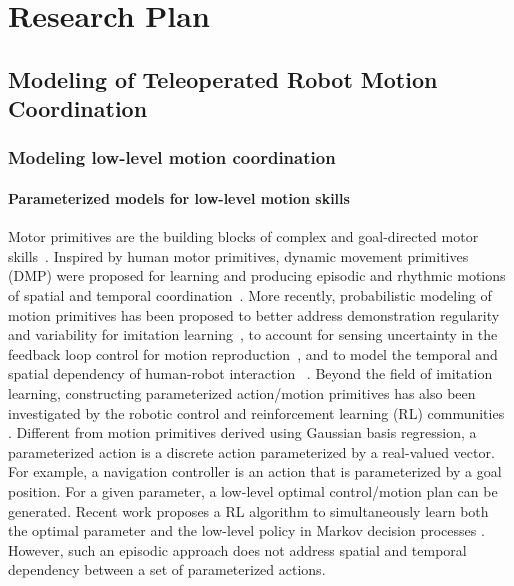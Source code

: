 \section{Research Plan}\label{sec:plan}

\subsection{Modeling of Teleoperated Robot Motion Coordination}\label{sec:plan-modeling}

\subsubsection{Modeling low-level motion coordination}\label{sec:plan-modeling-MP}

\paragraph*{Parameterized models for low-level motion skills} Motor primitives are the building blocks of complex and goal-directed motor skills~\cite{flash2005motor}. Inspired by human motor primitives, dynamic movement primitives (DMP) were proposed for learning and producing episodic and rhythmic motions of spatial and temporal coordination~\cite{ijspeert2013dynamical}. More recently, probabilistic modeling of motion primitives has been proposed to better address demonstration regularity and variability for imitation learning~\cite{calinon2007learning,calinon2010learning}, to account for sensing uncertainty in the feedback loop control for motion reproduction~\cite{meier2016probabilistic}, and to model the temporal and spatial dependency of human-robot interaction ~\cite{maeda2017phase}. Beyond the field of imitation learning, constructing parameterized action/motion primitives has also been investigated by the robotic control \cite{fu2013bottom} and reinforcement learning (RL) communities \cite{masson2016reinforcement}. Different from motion primitives derived using Gaussian basis regression, a parameterized action is a discrete action parameterized by a real-valued vector. For example, a navigation controller is an action that is parameterized by a goal position. For a given parameter, a low-level optimal control/motion plan can be generated. Recent work proposes a RL algorithm to simultaneously learn both the optimal parameter and the low-level policy in Markov decision processes \cite{masson2016reinforcement}. However, such an episodic approach does not address spatial and temporal dependency between a set of parameterized actions. 

